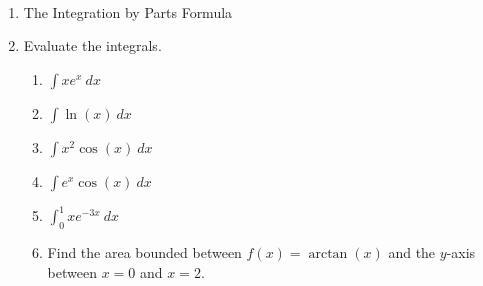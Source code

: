 \documentclass[11pt,fleqn]{article}
\begin{document}
\renewcommand{\headrulewidth}{0pt}
\newcommand{\blank}[1]{\rule{#1}{0.75pt}}
\newcommand{\bc}{\begin{center}}
\newcommand{\ec}{\end{center}}
\renewcommand{\d}{\displaystyle}

\vspace*{-0.7in}

\begin{center}
  \large
  \\
   
\end{center}

\begin{enumerate}
\item The Integration by Parts Formula
\vspace{1.5in}

\item Evaluate the integrals.
	\begin{enumerate}
	\item $\displaystyle \int xe^x \: dx$
	\vfill
	\item $\displaystyle \int \ln(x) \: dx$
	\vfill
	\item $\displaystyle \int x^2\cos(x) \: dx$
	\vfill
	\newpage
	\item $\displaystyle \int e^x\cos(x) \: dx$
	\vfill
	\item $\displaystyle \int_0^1 xe^{-3x} \: dx$
	\vfill
	\item Find the area bounded between $f(x)=\arctan(x)$ and the $y$-axis between $x=0$ and $x=2.$
	\vfill
	\end{enumerate}
\end{enumerate}
\end{document}

